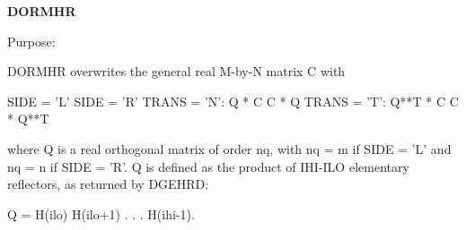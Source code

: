 {\bfseries D\+O\+R\+M\+H\+R} 

 \begin{DoxyParagraph}{Purpose\+: }
\begin{DoxyVerb} DORMHR overwrites the general real M-by-N matrix C with

                 SIDE = 'L'     SIDE = 'R'
 TRANS = 'N':      Q * C          C * Q
 TRANS = 'T':      Q**T * C       C * Q**T

 where Q is a real orthogonal matrix of order nq, with nq = m if
 SIDE = 'L' and nq = n if SIDE = 'R'. Q is defined as the product of
 IHI-ILO elementary reflectors, as returned by DGEHRD:

 Q = H(ilo) H(ilo+1) . . . H(ihi-1).\end{DoxyVerb}
 
\end{DoxyParagraph}

